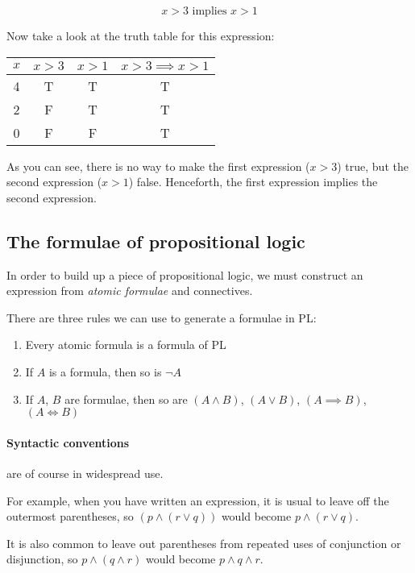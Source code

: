 \documentclass{article}
\begin{document}
\[
	x > 3 \textrm{ implies } x > 1
\]

Now take a look at the truth table for this expression:

\begin{center}
	\begin{tabular}{|c|c|c|c|}
		\hline
		$x$ & $x > 3$ & $x > 1$ & $x > 3 \implies x > 1$\\ \hline
		4 & T & T & T\\
		2 & F & T & T\\
		0 & F & F & T\\ \hline
	\end{tabular}
\end{center}

As you can see, there is no way to make the first expression ($x>3$) true, but
the second expression ($x>1$) false. Henceforth, the first expression implies
the second expression.

\subsection{The formulae of propositional logic}

In order to build up a piece of propositional logic, we must construct an
expression from {\it atomic formulae} and connectives.

There are three rules we can use to generate a formulae in PL:

\begin{enumerate}
	\item Every atomic formula is a formula of PL
	\item If $A$ is a formula, then so is $\neg A$
	\item If $A$, $B$ are formulae, then so are $(A \wedge B)$, $(A \vee B)$, $(A \implies B)$, $(A \iff B)$
\end{enumerate}

\paragraph{Syntactic conventions} are of course in widespread use. 

For example, when you have written an expression, it is usual to leave off the
outermost parentheses, so $(p \wedge (r \vee q))$ would become $p \wedge (r \vee
q)$.

It is also common to leave out parentheses from repeated uses of conjunction or
disjunction, so $p \wedge (q \wedge r)$ would become $p \wedge q \wedge r$.
\end{document}
